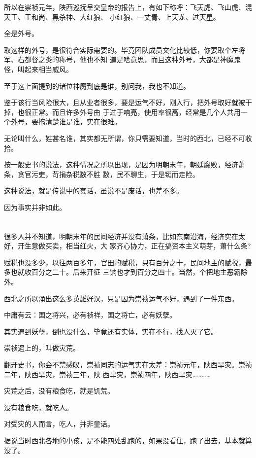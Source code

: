\documentclass[11pt,a4paper,onecolumn]{article}
\begin{document}
所以在崇祯元年，陕西巡抚呈交皇帝的报告上，有如下称呼：飞天虎、飞山虎、混天王、王和尚、黑杀神、大红狼、
小红狼、一丈青、上天龙、过天星。

全是外号。

取这样的外号，是很符合实际需要的。毕竟团队成员文化比较低，你要取个左将军、右都督之类的称号，他也不知
道是啥意思，而且这种外号，大都是神魔鬼怪，叫起来相当威风。

至于这上面提到的诸位神魔到底是谁，别问我，我也不知道。

鉴于该行当风险很大，且从业者很多，要是运气不好，刚入行，把外号取好就被干掉，也很正常。而且许多外号由
于过于响亮，使用率很高，经常是几个人共用一个外号，要搞清楚谁是谁，实在很难。

无论叫什么，姓甚名谁，其实都无所谓，你只需要知道，当时的西北，已经不可收拾。

按一般史书的说法，这种情况之所以出现，是因为明朝末年，朝廷腐败，经济萧条，贪官污吏，苛捐杂税数不胜
数，民不聊生，于是铤而走险。

这种说法，就是传说中的套话，虽说不是废话，也差不多。

因为事实并非如此。

\section[\thesection]{}

很多人并不知道，明朝末年的民间经济并没有萧条，比如东南沿海，经济实在太好，开生意做买卖，相当红火，大
家齐心协力，正在搞资本主义萌芽，萧什么条?

赋税也没多少，以往两百多年，官田的赋税，只有百分之十，民间地主的赋税，最多也就收百分之二十。后来开征
三饷也才到百分之四十。当然，个把地主恶霸除外。

西北之所以涌出这么多英雄好汉，只是因为崇祯运气不好，遇到了一件东西。

中庸有云：国之将兴，必有祯祥，国之将亡，必有妖孽。

其实遇到妖孽，倒也没什么，毕竟还有实体，实在不行，找人灭了它。

崇祯遇上的，叫做灾荒。

翻开史书，你会不禁感叹，崇祯同志的运气实在太差：崇祯元年，陕西旱灾。崇祯二年，陕西旱灾，崇祯三年，陕
西旱灾，崇祯四年，陕西旱灾…………

灾荒之后，没有粮食吃，就是饥荒。

没有粮食吃，就吃人。

对受灾的人而言，吃人，并非童话。

据说当时西北各地的小孩，是不能四处乱跑的，如果没看住，跑了出去，基本就算没了。
\end{document}

